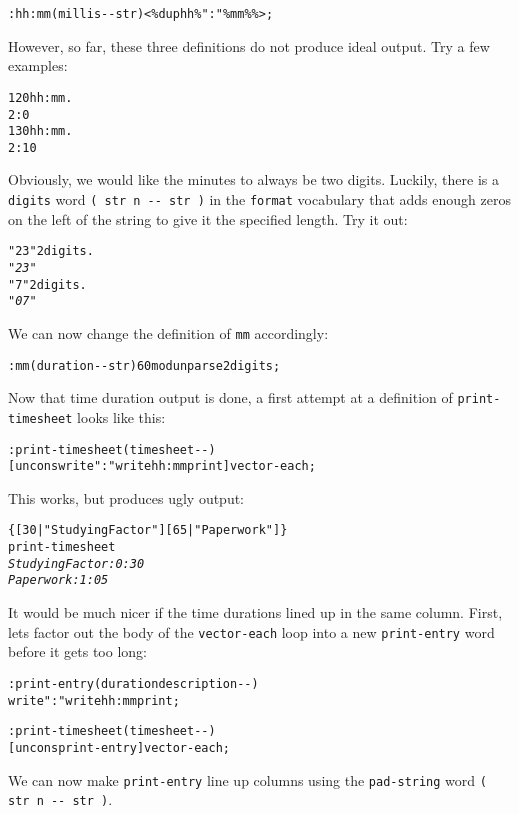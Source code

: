 \documentclass[english]{article}
\begin{document}
{\begin{alltt}
: hh:mm ( millis -{}- str ) <\% dup hh \% ":" \% mm \% \%> ;
\end{alltt}
However, so far, these three definitions do not produce ideal output.
Try a few examples:

\begin{alltt}
120 hh:mm .
2:0
130 hh:mm .
2:10
\end{alltt}
Obviously, we would like the minutes to always be two digits. Luckily,
there is a \texttt{digits} word \texttt{( str n -{}- str )} in the
\texttt{format} vocabulary that adds enough zeros on the left of the
string to give it the specified length. Try it out:

\begin{alltt}
"23" 2 digits .
\emph{"23"}
"7"2 digits .
\emph{"07"}
\end{alltt}
We can now change the definition of \texttt{mm} accordingly:

\begin{alltt}
: mm ( duration -{}- str ) 60 mod unparse 2 digits ;
\end{alltt}
Now that time duration output is done, a first attempt at a definition
of \texttt{print-timesheet} looks like this:

\begin{alltt}
: print-timesheet ( timesheet -{}- )
    {[} uncons write ": " write hh:mm print {]} vector-each ;
\end{alltt}
This works, but produces ugly output:

\begin{alltt}
\{ {[} 30 | "Studying Factor" {]} {[} 65 | "Paperwork" {]} \}
print-timesheet
\emph{Studying Factor: 0:30}
\emph{Paperwork: 1:05}
\end{alltt}

It would be much nicer if the time durations lined up in the same
column. First, lets factor out the body of the \texttt{vector-each}
loop into a new \texttt{print-entry} word before it gets too long:

\begin{alltt}
: print-entry ( duration description -{}- )
    write ": " write hh:mm print ;

: print-timesheet ( timesheet -{}- )
    {[} uncons print-entry {]} vector-each ;
\end{alltt}

We can now make \texttt{print-entry} line up columns using the \texttt{pad-string}
word \texttt{( str n -{}- str )}.

}
\end{document}
